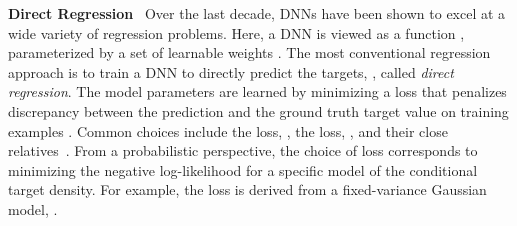\documentclass[runningheads]{llncs}
\newcommand{\parsection}[1]{\noindent\textbf{#1}~ }
\begin{document}
\parsection{Direct Regression}
Over the last decade, DNNs have been shown to excel at a wide variety of regression problems. Here, a DNN is viewed as a function , parameterized by a set of learnable weights . The most conventional regression approach is to train a DNN to directly predict the targets, , called \emph{direct regression}. The model parameters  are learned by minimizing a loss  that penalizes discrepancy between the prediction  and the ground truth target value  on training examples . Common choices include the  loss, , the  loss, , and their close relatives~\cite{huber1964robust,lathuiliere2019comprehensive}. From a probabilistic perspective, the choice of loss corresponds to minimizing the negative log-likelihood  for a specific model  of the conditional target density. For example, the  loss is derived from a fixed-variance Gaussian model, . 
\end{document}
